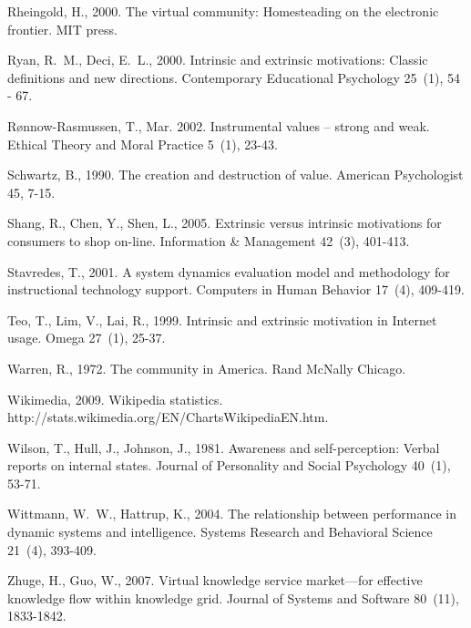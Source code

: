 \documentclass[doublespacing]{elsarticle}
\begin{document}
\begin{thebibliography}{52}
Rheingold, H., 2000. {The virtual community: Homesteading on the electronic
  frontier}. MIT press.

Ryan, R.~M., Deci, E.~L., 2000. Intrinsic and extrinsic motivations: Classic
  definitions and new directions. Contemporary Educational Psychology 25~(1),
  54 - 67.

Rønnow-Rasmussen, T., Mar. 2002. Instrumental values – strong and weak.
  Ethical Theory and Moral Practice 5~(1), 23-43.


Schwartz, B., 1990. The creation and destruction of value. American
  Psychologist 45, 7-15.

Shang, R., Chen, Y., Shen, L., 2005. {Extrinsic versus intrinsic motivations
  for consumers to shop on-line}. Information \& Management 42~(3), 401-413.

Stavredes, T., 2001. {A system dynamics evaluation model and methodology for
  instructional technology support}. Computers in Human Behavior 17~(4),
  409-419.

Teo, T., Lim, V., Lai, R., 1999. {Intrinsic and extrinsic motivation in
  Internet usage}. Omega 27~(1), 25-37.

Warren, R., 1972. {The community in America}. Rand McNally Chicago.

Wikimedia, 2009. Wikipedia statistics.
  http://stats.wikimedia.org/EN/ChartsWikipediaEN.htm.

Wilson, T., Hull, J., Johnson, J., 1981. Awareness and self-perception: Verbal
  reports on internal states. Journal of Personality and Social Psychology
  40~(1), 53-71.

Wittmann, W.~W., Hattrup, K., 2004. The relationship between performance in
  dynamic systems and intelligence. Systems Research and Behavioral Science
  21~(4), 393-409.


Zhuge, H., Guo, W., 2007. Virtual knowledge service market—for effective
  knowledge flow within knowledge grid. Journal of Systems and Software
  80~(11), 1833-1842.

\end{thebibliography}
\end{document}
